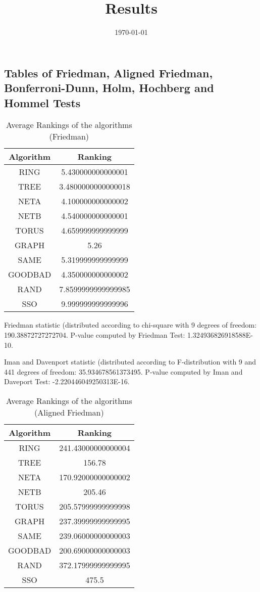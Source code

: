 \documentclass[a4paper,10pt]{article}
\title{Results}
\author{}
\date{\today}
\begin{document}
\begin{landscape}
\oddsidemargin 0in \topmargin 0in\maketitle
\section{Tables of Friedman, Aligned Friedman, Bonferroni-Dunn, Holm, Hochberg and Hommel Tests}
\begin{table}[!htp]
\centering
\caption{Average Rankings of the algorithms (Friedman)
}\begin{tabular}{c|c}
Algorithm&Ranking\\
\hline
 RING&5.430000000000001\\
 TREE&3.4800000000000018\\
 NETA&4.100000000000002\\
 NETB&4.540000000000001\\
 TORUS&4.659999999999999\\
 GRAPH&5.26\\
 SAME&5.319999999999999\\
 GOODBAD&4.350000000000002\\
 RAND&7.8599999999999985\\
 SSO&9.999999999999996\\
\end{tabular}
\end{table}


Friedman statistic (distributed according to chi-square with 9 degrees of freedom: 190.38872727272704. 
P-value computed by Friedman Test: 1.324936826918588E-10.\newline

Iman and Davenport statistic (distributed according to F-distribution with 9 and 441 degrees of freedom: 35.934678561373495. 
P-value computed by Iman and Daveport Test: -2.220446049250313E-16.\newline


\newpage

\begin{table}[!htp]
\centering
\caption{Average Rankings of the algorithms (Aligned Friedman)
}\begin{tabular}{c|c}
Algorithm&Ranking\\
\hline
 RING&241.43000000000004\\
 TREE&156.78\\
 NETA&170.92000000000002\\
 NETB&205.46\\
 TORUS&205.57999999999998\\
 GRAPH&237.39999999999995\\
 SAME&239.06000000000003\\
 GOODBAD&200.69000000000003\\
 RAND&372.17999999999995\\
 SSO&475.5\\
\end{tabular}
\end{table}



\end{landscape}
\end{document}
